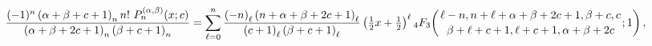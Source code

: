 \[\frac{(-1)^{n}\left(\alpha+\beta+c+1\right)_{n}n!\,\mathop{P^{(\alpha,\beta)}_%
{n}\/}\nolimits\!\left(x;c\right)}{\left(\alpha+\beta+2c+1\right)_{n}\left(%
\beta+c+1\right)_{n}}=\sum_{\ell=0}^{n}\frac{\left(-n\right)_{\ell}\left(n+%
\alpha+\beta+2c+1\right)_{\ell}}{\left(c+1\right)_{\ell}\left(\beta+c+1\right)%
_{\ell}}\left(\tfrac{1}{2}x+\tfrac{1}{2}\right)^{\ell}\*\mathop{{{}_{4}F_{3}}%
\/}\nolimits\!\left({\ell-n,n+\ell+\alpha+\beta+2c+1,\beta+c,c\atop\beta+\ell+%
c+1,\ell+c+1,\alpha+\beta+2c};1\right),\]